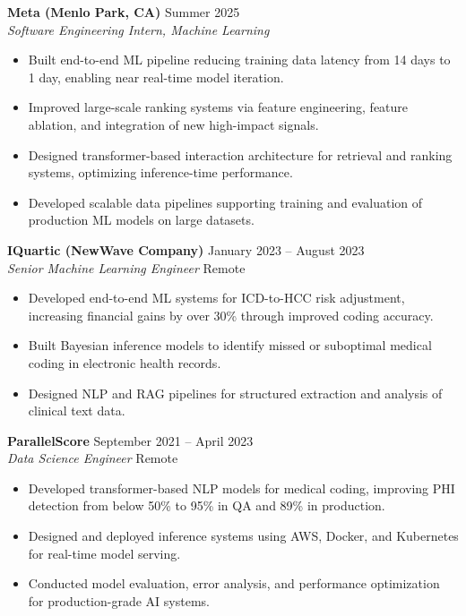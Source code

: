 \documentclass[11pt, letterpaper]{article}
\newcommand{\cvheading}[2]{%
  \noindent\textbf{#1} \hfill \textcolor{mutedgray}{\small #2}%
}
\newcommand{\cvsub}[2]{%
  \noindent\textit{#1} \hfill \textcolor{mutedgray}{\small #2}%
}
\begin{document}
\vspace{6pt}

\cvheading{Meta (Menlo Park, CA)}{Summer 2025}\\
\cvsub{Software Engineering Intern, Machine Learning}{}
\begin{itemize}
  \item Built end-to-end ML pipeline reducing training data latency from 14 days to 1 day, enabling near real-time model iteration.
  \item Improved large-scale ranking systems via feature engineering, feature ablation, and integration of new high-impact signals.
  \item Designed transformer-based interaction architecture for retrieval and ranking systems, optimizing inference-time performance.
  \item Developed scalable data pipelines supporting training and evaluation of production ML models on large datasets.
\end{itemize}

\vspace{6pt}

\cvheading{IQuartic (NewWave Company)}{January 2023 -- August 2023}\\
\cvsub{Senior Machine Learning Engineer}{Remote}
\begin{itemize}
  \item Developed end-to-end ML systems for ICD-to-HCC risk adjustment, increasing financial gains by over 30\% through improved coding accuracy.
  \item Built Bayesian inference models to identify missed or suboptimal medical coding in electronic health records.
  \item Designed NLP and RAG pipelines for structured extraction and analysis of clinical text data.
\end{itemize}

\vspace{6pt}

\cvheading{ParallelScore}{September 2021 -- April 2023}\\
\cvsub{Data Science Engineer}{Remote}
\begin{itemize}
  \item Developed transformer-based NLP models for medical coding, improving PHI detection from below 50\% to 95\% in QA and 89\% in production.
  \item Designed and deployed inference systems using AWS, Docker, and Kubernetes for real-time model serving.
  \item Conducted model evaluation, error analysis, and performance optimization for production-grade AI systems.
\end{itemize}
\end{document}
